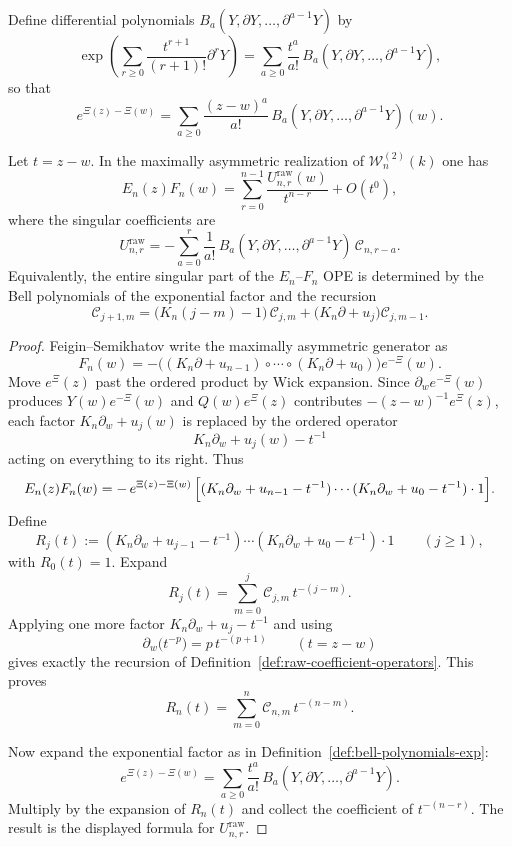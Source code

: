 \begin{definition}
\label{def:bell-polynomials-exp}
Define differential polynomials $B_a(Y,\partial Y,\dots,\partial^{a-1}Y)$ by
\[
\exp\!\left(
\sum_{r\geq 0}\frac{t^{r+1}}{(r+1)!}\partial^r Y
\right)
=
\sum_{a\geq 0}\frac{t^a}{a!}\,B_a(Y,\partial Y,\dots,\partial^{a-1}Y),
\]
so that
\[
e^{\Xi(z)-\Xi(w)}
=
\sum_{a\geq 0}
\frac{(z-w)^a}{a!}\,
B_a(Y,\partial Y,\dots,\partial^{a-1}Y)(w).
\]
\end{definition}

\begin{theorem}
\label{thm:full-raw-coefficient-packet}
Let $t=z-w$. In the maximally asymmetric realization of
$\mathcal W_n^{(2)}(k)$ one has
\[
E_n(z)F_n(w)
=
\sum_{r=0}^{n-1}\frac{U_{n,r}^{\mathrm{raw}}(w)}{t^{n-r}}
+ O(t^0),
\]
where the singular coefficients are
\[
U_{n,r}^{\mathrm{raw}}
=
-
\sum_{a=0}^{r}
\frac{1}{a!}\,
B_a(Y,\partial Y,\dots,\partial^{a-1}Y)\,
\mathcal C_{n,r-a}.
\]
Equivalently, the entire singular part of the $E_n$--$F_n$ OPE is determined
by the Bell polynomials of the exponential factor and the recursion
\[
\mathcal C_{j+1,m}
=
\bigl(K_n(j-m)-1\bigr)\,\mathcal C_{j,m}
+
\bigl(K_n\partial + u_j\bigr)\mathcal C_{j,m-1}.
\]
\end{theorem}

\begin{proof}
Feigin--Semikhatov write the maximally asymmetric generator as
\[
F_n(w)=-\bigl((K_n\partial + u_{n-1})\circ\cdots\circ(K_n\partial+u_0)\bigr)e^{-\Xi}(w).
\]
Move $e^{\Xi}(z)$ past the ordered product by Wick expansion. Since
$\partial_w e^{-\Xi}(w)$ produces $Y(w)e^{-\Xi}(w)$ and
$Q(w)e^{\Xi}(z)$ contributes $-(z-w)^{-1}e^{\Xi}(z)$, each factor
$K_n\partial_w+u_j(w)$ is replaced by the ordered operator
\[
K_n\partial_w + u_j(w) - t^{-1}
\]
acting on everything to its right. Thus
\[
E_n(z)F_n(w)
=
-\,e^{\Xi(z)-\Xi(w)}\,
\Bigl[(K_n\partial_w+u_{n-1}-t^{-1})\cdots(K_n\partial_w+u_0-t^{-1})\cdot 1\Bigr].
\]
Define
\[
R_j(t):=(K_n\partial_w+u_{j-1}-t^{-1})\cdots(K_n\partial_w+u_0-t^{-1})\cdot 1
\qquad (j\geq 1),
\]
with $R_0(t)=1$. Expand
\[
R_j(t)=\sum_{m=0}^j \mathcal C_{j,m}\,t^{-(j-m)}.
\]
Applying one more factor $K_n\partial_w+u_j-t^{-1}$ and using
\[
\partial_w \bigl(t^{-p}\bigr)= p\,t^{-(p+1)}
\qquad (t=z-w)
\]
gives exactly the recursion of
Definition~\ref{def:raw-coefficient-operators}. This proves
\[
R_n(t)=\sum_{m=0}^n \mathcal C_{n,m}\,t^{-(n-m)}.
\]

Now expand the exponential factor as in
Definition~\ref{def:bell-polynomials-exp}:
\[
e^{\Xi(z)-\Xi(w)}
=
\sum_{a\geq 0}
\frac{t^a}{a!}\,
B_a(Y,\partial Y,\dots,\partial^{a-1}Y).
\]
Multiply by the expansion of $R_n(t)$ and collect the coefficient of
$t^{-(n-r)}$. The result is the displayed formula for
$U_{n,r}^{\mathrm{raw}}$.
\end{proof}

